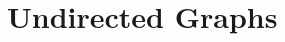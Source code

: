 \documentclass[runningheads]{llncs}
\begin{document}

% 



% 

\section{Undirected Graphs}




\end{document}
